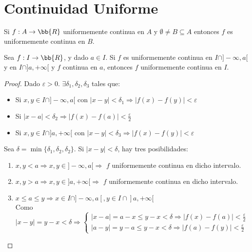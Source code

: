 \section{Continuidad Uniforme}

\begin{prop*}
    Si $f:A\to \bb{R}$ uniformemente continua en $A$ y $\emptyset \neq B \subseteq A$ entonces $f$ es uniformemente continua en $B$.
\end{prop*}

\begin{prop*}\label{Prop:Pegado}
    Sea $f:I\to \bb{R}$, y dado $a\in I$. Si $f$ es uniformemente continua en $I \cap ]-\infty, a[$ y en $I\cap ]a, +\infty[$ y $f$ continua en $a$, entonces $f$ uniformemente continua en $I$.
\end{prop*}
\begin{proof}
    Dado $\varepsilon >0$. $\exists \delta_1, \delta_2, \delta_3$ tales que:
    \begin{itemize}
        \item Si $x,y\in I\cap ]-\infty, 
        a[$ con $|x-y|<\delta_1 \Longrightarrow |f(x)-f(y)| < \varepsilon$
        \item Si $|x-a|<\delta_2 \Longrightarrow |f(x)-f(a)|<\frac{\varepsilon}{2}$
        \item Si $x,y\in I\cap ]a, +\infty[$ con $|x-y|<\delta_3 \Longrightarrow |f(x)-f(y)| < \varepsilon$
    \end{itemize}

    Sea $\delta = \min \{\delta_1, \delta_2, \delta_2\}$. Si $|x-y| < \delta$, hay tres posibilidades:
    \begin{enumerate}
        \item $x,y < a \Longrightarrow x,y\in ]-\infty, a[ \Longrightarrow $ $f$ uniformemente continua en dicho intervalo.

        \item $x,y > a \Longrightarrow x,y\in ]a, +\infty[ \Longrightarrow $ $f$ uniformemente continua en dicho intervalo.

        \item $x \leq a \leq y \Longrightarrow x\in  I\cap ]-\infty, 
        a[, y\in I\cap ]a, +\infty[$\\
        Como $|x-y| = y-x < \delta \Longrightarrow
        \left\{\begin{array}{l}
            |x-a| = a-x \leq y-x < \delta \Longrightarrow |f(x) - f(a)| < \frac{\varepsilon}{2} \\
            |a-y| = y-a \leq y-x < \delta \Longrightarrow |f(a) - f(y)| < \frac{\varepsilon}{2}
        \end{array} \right.
        $


\end{enumerate}
\end{proof}
